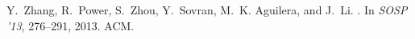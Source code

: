 \documentclass[11pt]{article}
\begin{document}
\begin{thebibliography}{10}
\begin{small}
Y.~Zhang, R.~Power, S.~Zhou, Y.~Sovran, M.~K. Aguilera, and J.~Li.
.
\newblock In {\em SOSP '13}, 276--291, 2013. ACM.


\end{small} 
\end{thebibliography}
\end{document}
